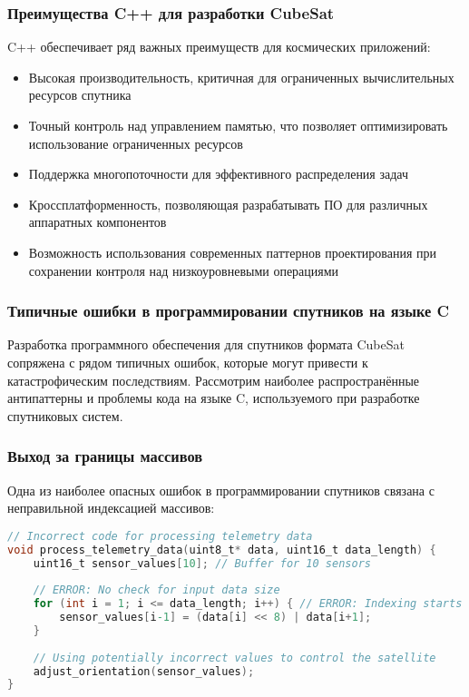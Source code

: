 \subsubsection{Преимущества C++ для разработки CubeSat}
C++ обеспечивает ряд важных преимуществ для космических приложений:

\begin{itemize}
    \item Высокая производительность, критичная для ограниченных вычислительных ресурсов спутника\cite{leppinen2021cpp}
    \item Точный контроль над управлением памятью, что позволяет оптимизировать использование ограниченных ресурсов\cite{leppinen2021cpp}\cite{nasa2018memory}
    \item Поддержка многопоточности для эффективного распределения задач\cite{leppinen2021cpp}
    \item Кроссплатформенность, позволяющая разрабатывать ПО для различных аппаратных компонентов\cite{leppinen2021cpp}
    \item Возможность использования современных паттернов проектирования при сохранении контроля над низкоуровневыми операциями
\end{itemize}

\subsubsection{Типичные ошибки в программировании спутников на языке C}

Разработка программного обеспечения для спутников формата CubeSat сопряжена с рядом типичных ошибок, которые могут привести к катастрофическим последствиям. Рассмотрим наиболее распространённые антипаттерны и проблемы кода на языке C, используемого при разработке спутниковых систем.

\subsubsection{Выход за границы массивов}

Одна из наиболее опасных ошибок в программировании спутников связана с неправильной индексацией массивов\cite{stack_overflow}:

\begin{lstlisting}[language=C, caption=Выход за границы массива при обработке телеметрии]
// Incorrect code for processing telemetry data
void process_telemetry_data(uint8_t* data, uint16_t data_length) {
    uint16_t sensor_values[10]; // Buffer for 10 sensors
    
    // ERROR: No check for input data size
    for (int i = 1; i <= data_length; i++) { // ERROR: Indexing starts from 1
        sensor_values[i-1] = (data[i] << 8) | data[i+1];
    }
    
    // Using potentially incorrect values to control the satellite
    adjust_orientation(sensor_values);
}
\end{lstlisting}

